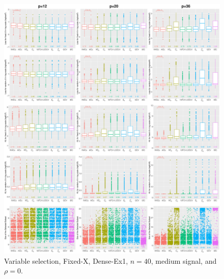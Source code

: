 \begin{figure}[!ht]
\centering
\includegraphics[width=\textwidth]{figures/supplement/fixedx/subset_selection/Dense-Ex1_n40_msnr_rho0.eps}
\caption{Variable selection, Fixed-X, Dense-Ex1, $n=40$, medium signal, and $\rho=0$.}
\end{figure}
\clearpage
